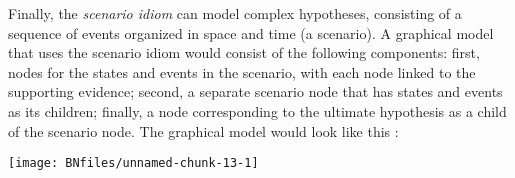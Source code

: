 \documentclass{article}
\begin{document}



Finally, the \textit{scenario idiom} can model  complex hypotheses, consisting of a sequence of events organized in space and time (a scenario). A graphical model that uses the scenario idiom would consist of the following components: first, nodes for the states and events in the scenario, with each node linked to the supporting evidence; second, a separate scenario node that has states and events as its children; finally, a node corresponding to the ultimate hypothesis as a child of the scenario node. The graphical 
model would look like this %
\citep{vlek2014building}:

%
\begin{center}\texttt{[image: BNfiles/unnamed-chunk-13-1]} \end{center}



\end{document}
